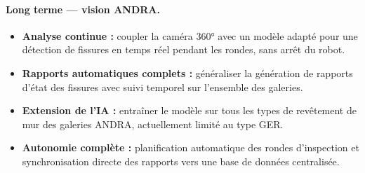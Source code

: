 \documentclass[12pt,a4paper]{article}
\begin{document}
\paragraph{Long terme — vision ANDRA.}
\begin{itemize}
    \item \textbf{Analyse continue :} coupler la caméra 360° avec un modèle adapté pour une détection de fissures en temps réel pendant les rondes, sans arrêt du robot.
    \item \textbf{Rapports automatiques complets :} généraliser la génération de rapports d'état des fissures avec suivi temporel sur l'ensemble des galeries.
    \item \textbf{Extension de l'IA :} entraîner le modèle sur tous les types de revêtement de mur des galeries ANDRA, actuellement limité au type GER.
    \item \textbf{Autonomie complète :} planification automatique des rondes d'inspection et synchronisation directe des rapports vers une base de données centralisée.
\end{itemize}

\newpage
\printbibliography[heading=bibintoc, title={Références}]
\end{document}
